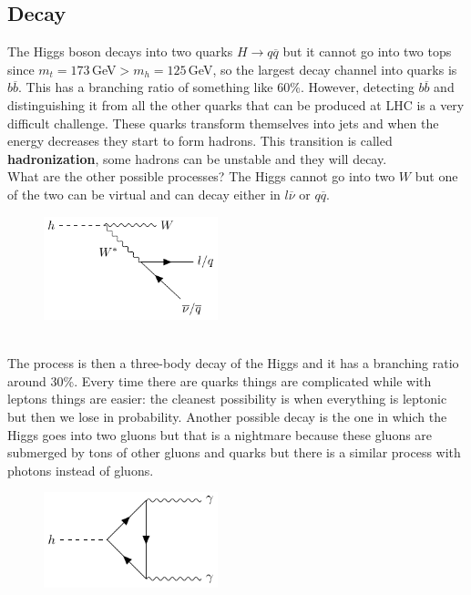 \documentclass[../main.tex]{subfiles}
\begin{document}
\subsection{Decay}
The Higgs boson decays into two quarks $H\to q\overline{q}$ but it cannot go into two tops since $m_t=173$\,GeV$>m_h=125$\,GeV, so the largest decay channel into quarks is $b\overline{b}$. This has a branching ratio of something like 60\%. However, detecting $b\overline{b}$ and distinguishing it from all the other quarks that can be produced at LHC is a very difficult challenge. These quarks transform themselves into jets and when the energy decreases they start to form hadrons. This transition is called \textbf{hadronization}, some hadrons can be unstable and they will decay.\\
What are the other possible processes? The Higgs cannot go into two $W$ but one of the two can be virtual and can decay either in $l\overline{\nu}$ or $q\overline{q}$.
\begin{figure}[h]
    \centering
    \includegraphics[width=0.45\textwidth]{Images/hd1.pdf}
    \caption*{}
\end{figure}\\
The process is then a three-body decay of the Higgs and it has a branching ratio around 30\%. Every time there are quarks things are complicated while with leptons things are easier: the cleanest possibility is when everything is leptonic but then we lose in probability. Another possible decay is the one in which the Higgs goes into two gluons but that is a nightmare because these gluons are submerged by tons of other gluons and quarks but there is a similar process with photons instead of gluons.
\begin{figure}[h]
    \centering
    \includegraphics[width=0.45\textwidth]{Images/hphotons.pdf}
    \caption*{}
\end{figure}\\
\end{document}
